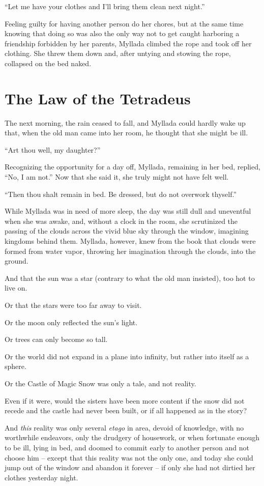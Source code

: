 ``Let me have your clothes and I'll bring them clean next night.''

Feeling guilty for having another person do her chores, but at the same time knowing that doing so was also the only way not to get caught harboring a friendship forbidden by her parents, Myllada climbed the rope and took off her clothing. She threw them down and, after untying and stowing the rope, collapsed on the bed naked.

\chapter{The Law of the Tetradeus}

The next morning, the rain ceased to fall, and Myllada could hardly wake up that, when the old man came into her room, he thought that she might be ill.

``Art thou well, my daughter?''

Recognizing the opportunity for a day off, Myllada, remaining in her bed, replied, ``No, I am not.'' Now that she said it, she truly might not have felt well.

``Then thou shalt remain in bed. Be dressed, but do not overwork thyself.''

\centeredstars

While Myllada was in need of more sleep, the day was still dull and uneventful when she was awake, and, without a clock in the room, she scrutinized the passing of the clouds across the vivid blue sky through the window, imagining kingdoms behind them. Myllada, however, knew from the book that clouds were formed from water vapor, throwing her imagination through the clouds, into the ground.

And that the sun was a star (contrary to what the old man insisted), too hot to live on.

Or that the stars were too far away to visit.

Or the moon only reflected the sun's light.

Or trees can only become so tall.

Or the world did not expand in a plane into infinity, but rather into itself as a sphere.

Or the Castle of Magic Snow was only a tale, and not reality.

Even if it were, would the sisters have been more content if the snow did not recede and the castle had never been built, or if all happened as in the story?

And \emph{this} reality was only several \emph{etago} in area, devoid of knowledge, with no worthwhile endeavors, only the drudgery of housework, or when fortunate enough to be ill, lying in bed, and doomed to commit early to another person and not choose him -- except that this reality was not the only one, and today she could jump out of the window and abandon it forever -- if only she had not dirtied her clothes yesterday night.

